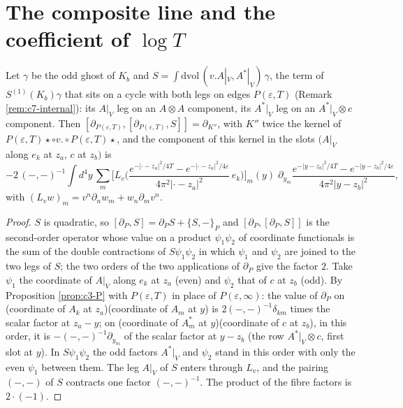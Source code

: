 \section{The composite line and the coefficient of $\log T$}

\begin{lemma}
\label{lem:kj-composite}
Let $\gamma$ be the odd ghost of $K_b$ and $S=\int\mathrm{dvol}\,(v.A|_V,A^*|_V)\,\gamma$, the term of $S^{(1)}(K_b)\gamma$ that sits on a cycle with both legs on edges $P(\varepsilon,T)$ (Remark \ref{rem:c7-internal}): its $A|_V$ leg on an $A\otimes A$ component, its $A^*|_V$ leg on an $A^*|_V\otimes c$ component. Then $[\partial_{P(\varepsilon,T)},[\partial_{P(\varepsilon,T)},S]]=\partial_{K''}$, with $K''$ twice the kernel of $P(\varepsilon,T)\star\circ v.\circ P(\varepsilon,T)\star$, and the component of this kernel in the slots $(A|_V$ along $e_k$ at $z_a$, $c$ at $z_b)$ is
\begin{equation}
-2\,(-,-)^{-1}\int d^4y\,\sum_m\Big[L_v\Big(\frac{e^{-|\cdot-z_a|^2/4T}-e^{-|\cdot-z_a|^2/4\varepsilon}}{4\pi^2|\cdot-z_a|^2}\,e_k\Big)\Big]_m(y)\;\partial_{y_m}\frac{e^{-|y-z_b|^2/4T}-e^{-|y-z_b|^2/4\varepsilon}}{4\pi^2|y-z_b|^2},
\label{eq:kj-CL}
\end{equation}
with $(L_vw)_m=v^n\partial_nw_m+w_n\partial_mv^n$.
\end{lemma}

\begin{proof}
$S$ is quadratic, so $[\partial_P,S]=\partial_PS+\{S,-\}_P$ and $[\partial_P,[\partial_P,S]]$ is the second-order operator whose value on a product $\psi_1\psi_2$ of coordinate functionals is the sum of the double contractions of $S\psi_1\psi_2$ in which $\psi_1$ and $\psi_2$ are joined to the two legs of $S$; the two orders of the two applications of $\partial_P$ give the factor $2$. Take $\psi_1$ the coordinate of $A|_V$ along $e_k$ at $z_a$ (even) and $\psi_2$ that of $c$ at $z_b$ (odd). By Proposition \ref{prop:c3-P} with $P(\varepsilon,T)$ in place of $P(\varepsilon,\infty)$: the value of $\partial_P$ on (coordinate of $A_k$ at $z_a$)(coordinate of $A_m$ at $y$) is $2(-,-)^{-1}\delta_{km}$ times the scalar factor at $z_a-y$; on (coordinate of $A^*_m$ at $y$)(coordinate of $c$ at $z_b$), in this order, it is $-(-,-)^{-1}\partial_{y_m}$ of the scalar factor at $y-z_b$ (the row $A^*|_V\otimes c$, first slot at $y$). In $S\psi_1\psi_2$ the odd factors $A^*|_V$ and $\psi_2$ stand in this order with only the even $\psi_1$ between them. The leg $A|_V$ of $S$ enters through $L_v$, and the pairing $(-,-)$ of $S$ contracts one factor $(-,-)^{-1}$. The product of the fibre factors is $2\cdot(-1)$.
\end{proof}

